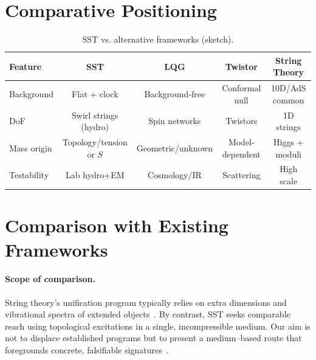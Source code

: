 \documentclass[10pt,reprint,aps,onecolumn,nofootinbib]{revtex4-2}
\begin{document}

    \section{Comparative Positioning}
    \label{sec:SST-compare}

    \begin{table}[h]
    \centering
    \caption{SST vs. alternative frameworks (sketch).}
    \begin{tabular}{lcccc}
    \hline
    Feature & SST & LQG & Twistor & String Theory \\
    \hline
    Background & Flat + clock & Background-free & Conformal null & 10D/AdS common \\
    DoF & Swirl strings (hydro) & Spin networks & Twistors & 1D strings \\
    Mass origin & Topology/tension or $S$ & Geometric/unknown & Model-dependent & Higgs + moduli \\
    Testability & Lab hydro+EM & Cosmology/IR & Scattering & High scale \\
    \hline
    \end{tabular}
    \end{table}




    \section{Comparison with Existing Frameworks}\label{sec:comparison}

        \paragraph*{Scope of comparison.}
            String theory’s unification program typically relies on extra dimensions and vibrational spectra of extended objects~\cite{Susskind2003}. By contrast, SST seeks comparable reach using topological excitations in a single, incompressible medium. Our aim is not to displace established programs but to present a medium–based route that foregrounds concrete, falsifiable signatures~\cite{Hossenfelder2018}.
\end{document}
